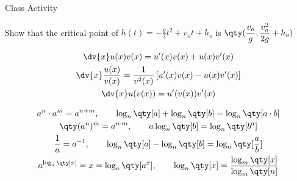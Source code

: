 \documentclass[../tufte-style.tex]{standalone}
\begin{document}
\date{March 11, 2026}


\begin{frame}{Class Activity}

    Show that the critical point of \(h(t) = -\frac{g}{2}t^2 + v_o t + h_o\) is \( \qty( \dfrac{v_o}{g}, \dfrac{v_o^2}{2g}+h_o ) \)


\vfill

    \begin{minipage}[c]{0.45\textwidth}
        \begin{gather*}
            \dv{x}u(x)v(x) = u'(x)v(x) + u(x)v'(x) \\
            \dv{x}\frac{u(x)}{v(x)} = \frac{1}{v^{2}(x)}\left[ u'(x)v(x) - u(x)v'(x) \right] \\
            \dv{x}u(v(x)) = u'(v(x))v'(x)
        \end{gather*}
    \end{minipage}
    \hfill
    \begin{minipage}[c]{0.45\textwidth}
        \begin{gather*}
            a^{n}\cdot a^{m} = a^{n+m},\qquad  \log_{n}\qty[a] + \log_{n}\qty[b] = \log_{n}\qty[a\cdot b] \\
            \qty(a^{n})^{m} = a^{n\cdot m},\qquad  a\log_{n}\qty[b] = \log_{n}\qty[b^a] \\
            \frac{1}{a} = a^{-1},\qquad  \log_{n}\qty[a] - \log_{n}\qty[b] = \log_{n}\qty[\frac{a}{b}] \\
            a^{\log_{a}\qty[x]} = x = \log_a\qty[a^{x}],\qquad  \log_{n}\qty[x] = \frac{\log_{m}\qty[x]}{\log_{m}\qty[n]}
        \end{gather*}

    \end{minipage}

\end{frame}
\end{document}
